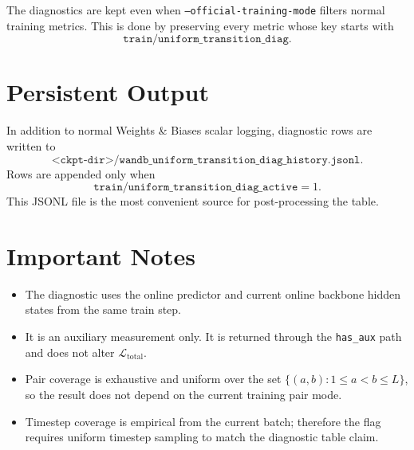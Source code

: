 \documentclass[11pt]{article}
\begin{document}
The diagnostics are kept even when \texttt{--official-training-mode} filters
normal training metrics. This is done by preserving every metric whose key
starts with
\[
\texttt{train/uniform\_transition\_diag}.
\]

\section{Persistent Output}
In addition to normal Weights \& Biases scalar logging, diagnostic rows are
written to
\[
\texttt{<ckpt-dir>/wandb\_uniform\_transition\_diag\_history.jsonl}.
\]
Rows are appended only when
\[
\texttt{train/uniform\_transition\_diag\_active}=1.
\]
This JSONL file is the most convenient source for post-processing the table.

\section{Important Notes}
\begin{itemize}
\item The diagnostic uses the online predictor and current online backbone
hidden states from the same train step.
\item It is an auxiliary measurement only. It is returned through the
\texttt{has\_aux} path and does not alter \(\mathcal{L}_{\mathrm{total}}\).
\item Pair coverage is exhaustive and uniform over the set
\(\{(a,b):1\leq a<b\leq L\}\), so the result does not depend on the current
training pair mode.
\item Timestep coverage is empirical from the current batch; therefore the flag
requires uniform timestep sampling to match the diagnostic table claim.
\end{itemize}
\end{document}
